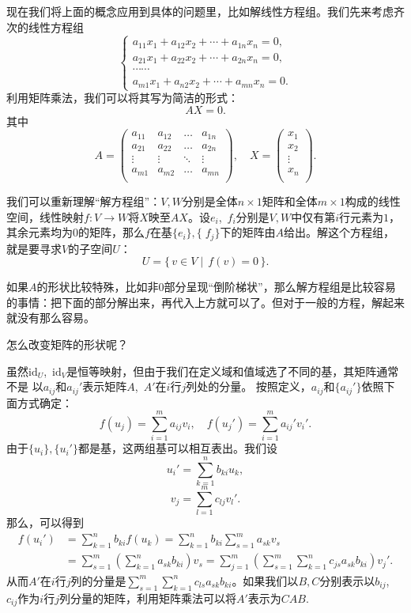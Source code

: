 现在我们将上面的概念应用到具体的问题里，比如解线性方程组。我们先来考虑齐次的线性方程组
\[
    \begin{cases}
        a_{11}x_1+a_{12}x_2+\cdots+a_{1n}x_n=0, \\
        a_{21}x_1+a_{22}x_2+\cdots+a_{2n}x_n=0, \\
        \mathord{\cdots}\mathord{\cdots}        \\
        a_{m1}x_1+a_{n2}x_2+\cdots +a_{mn}x_n=0.
    \end{cases}
\]
利用矩阵乘法，我们可以将其写为简洁的形式：
\[AX=0.\]
其中
\[A = \begin{pmatrix}
        a_{11} & a_{12} & \ldots & a_{1n} \\
        a_{21} & a_{22} & \ldots & a_{2n} \\
        \vdots & \vdots & \ddots & \vdots \\
        a_{m1} & a_{m2} & \ldots & a_{mn} \\
    \end{pmatrix},\quad
    X = \begin{pmatrix}
        x_1    \\
        x_2    \\
        \vdots \\
        x_n    \\
    \end{pmatrix}.\]

我们可以重新理解“解方程组”：$V,W$分别是全体$n\times 1$矩阵和全体$m\times 1$构成的线性空间，线性映射$f:V\to W$将$X$映至$AX$。设$e_i$,~$f_i$分别是$V,W$中仅有第$i$行元素为$1$，其余元素均为$0$的矩阵，那么$f$在基$\{e_i\},\{\;\!f_j\}$下的矩阵由$A$给出。解这个方程组，就是要寻求$V$的子空间$U$：
\[U=\bigl\{\,v\in V\mid\, f(v)=0\,\bigr\}.\]

如果$A$的形状比较特殊，比如非$0$部分呈现“倒阶梯状”，那么解方程组是比较容易的事情：把下面的部分解出来，再代入上方就可以了。但对于一般的方程，解起来就没有那么容易。

怎么改变矩阵的形状呢？

虽然$\mathrm{id}_U$,~$\mathrm{id}_V$是恒等映射，但由于我们在定义域和值域选了不同的基，其矩阵通常不是
以$a_{ij}$和$a_{ij}'$表示矩阵$A$,~$A'$在$i$行$j$列处的分量。
按照定义，$a_{ij}$和$\{a_{ij}'\}$依照下面方式确定：
\[
    f(u_j)=\sum_{i=1}^ma_{ij}v_i,\quad f(u_j')=\sum_{i=1}^ma_{ij}'v_i'
    .\]
由于$\{u_i\},\{u_i'\}$都是基，这两组基可以相互表出。我们设
\[
    u_i'=\sum_{k=1}^nb_{ki}u_{k}
    ,\]
\[
    v_j=\sum_{l=1}^mc_{lj}v_l'
    .\]
那么，可以得到
\begin{align*}
    f(u_i') & =\sum_{k=1}^nb_{ki}f(u_k)
    =\sum_{k=1}^nb_{ki}\sum_{s=1}^ma_{sk}v_s                           \\
            & =\sum_{s=1}^m\left( \sum_{k=1}^na_{sk}b_{ki} \right) v_s
    =\sum_{j=1}^m\left( \sum_{s=1}^m\sum_{k=1}^nc_{js}a_{sk}b_{ki} \right) v_j'.
\end{align*}
从而$A'$在$i$行$j$列的分量是$\sum_{s=1}^m\sum_{k=1}^nc_{ls}a_{sk}b_{ki}$。如果我们以$B,C$分别表示以$b_{ij}$,~$c_{ij}$作为$i$行$j$列分量的矩阵，利用矩阵乘法可以将$A'$表示为$CAB$.